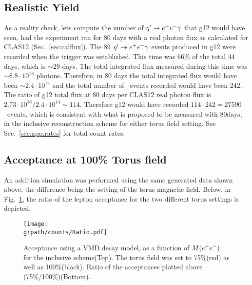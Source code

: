 \subsection{Realistic Yield}
As a reality check, lets compute the number of $\eta^{\prime} \to e^+e^- \gamma$ that g12 would have seen, had the experiment ran for 80 days with a real photon flux as calculated for CLAS12 (Sec.~\ref{sec:calflux}). %
The 89 $\eta^{\prime} \to e^+e^- \gamma$ events produced in g12 were recorded when the \epemT trigger was established. This time was 66\% of the total 44 days, which is $\sim29$ days. The total integrated flux measured during this time was $\sim 8.8\cdot 10^{13}$ photons. Therefore, in 80 days the total integrated flux would have been $\sim 2.4\cdot 10^{14}$ and the total number of \etaPDal \ events recorded would have been 242. The ratio of g12 total flux at 80 days per CLAS12 real photon flux is $2.73\cdot 10^{16} / 2.4\cdot 10^{14} \sim 114 $. Therefore g12 would have recorded $114\cdot 242 = 27590$ \etaPDal \ events, which is consistent with what is proposed to be measured with 80days, in the inclusive reconstruction scheme for either torus field setting. See Sec.~\ref{sec:app.rates} for total count rates.
\subsection{Acceptance at 100\% Torus field}
An addition simulation was performed using the same generated data shown above, the difference being the setting of the torus magnetic field. Below, in Fig.~\ref{fig:ratio}, the ratio of the lepton acceptance for the two different torus settings is depicted.
\begin{figure}[h!]\begin{center}
 		\texttt{[image: \\grpath/counts/Ratio.pdf]}
 		\caption[Acceptance, as a function of $M(\epem)$]{\label{fig:ratio}{Acceptance using a VMD decay model, as a function of $M(\epem)$ for the inclusive scheme(Top). The torus field was set to 75\%(red) as well as 100\%(black). Ratio of the acceptances plotted above (75\%/100\%)(Bottom). }}
\end{center}\end{figure}